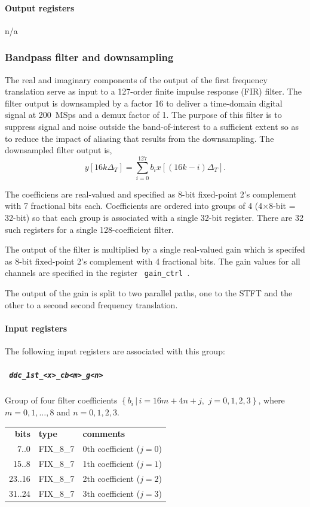 \documentclass[a4paper,10pt]{article}
\newcommand{\ilcode}[1]{\begingroup
	\setlength{\fboxsep}{1pt}\colorbox{ilcodebg}{\small\tt%
		#1%
	}\endgroup}
\begin{document}
\paragraph{Output registers}
n/a

\subsubsection{Bandpass filter and downsampling}
\label{sec:gwdcpddc1}
The real and imaginary components of the output of the first frequency 
translation serve as input to a 127-order finite impulse response (FIR) 
filter.
The filter output is downsampled by a factor 16 to deliver a 
time-domain digital signal at 200~MSps and a demux factor of 1.
The purpose of this filter is to suppress signal and noise 
outside the band-of-interest to a sufficient extent so as to reduce the 
impact of aliasing that results from the downsampling.
The downsampled filter output is,
\begin{equation}
	\label{eq:ddc1fir}
	y[16k\Delta_{T}] = \sum_{i=0}^{127} b_{i}x[(16k-i)\Delta_{T}].
\end{equation}

The coefficiens are real-valued and specified as 8-bit fixed-point 2's 
complement with 7 fractional bits each. Coefficients are ordered into 
groups of 4 (4$\times$8-bit = 32-bit) so that each group is associated 
with a single 32-bit register. There are 32 such registers for a single 
128-coefficient filter.

The output of the filter is multiplied by a single real-valued gain 
which is specifed as 8-bit fixed-point 2's complement with 4 fractional 
bits. The gain values for all channels are specified in the register 
\ilcode{gain\_ctrl}.

The output of the gain is split to two parallel paths, one to the STFT 
and the other to a second second frequency translation.

\paragraph{Input registers}
The following input registers are associated with this group:

\subparagraph{\ilcode{ddc\_1st\_<x>\_cb<m>\_g<n>}}
Group of four filter coefficients $\left\{b_{i}\,|\,i = 16m + 4n + j,\right.$
$\left. j = 0,1,2,3\right\}$, where $m=0,1,\ldots,8$ and $n=0,1,2,3$.\\
\begin{tabular}{rll}
	{\bf bits} & {\bf type} & {\bf comments}\\
	  7..0 & FIX\_8\_7 & 0th coefficient ($j=0$)\\
	 15..8 & FIX\_8\_7 & 1th coefficient ($j=1$)\\
	23..16 & FIX\_8\_7 & 2th coefficient ($j=2$)\\
	31..24 & FIX\_8\_7 & 3th coefficient ($j=3$)
\end{tabular}
\end{document}
